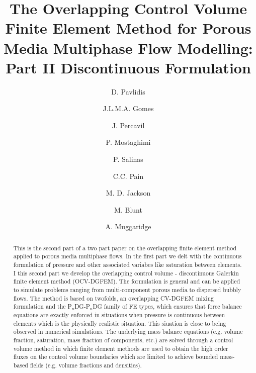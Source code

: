 \documentclass[preprint,authoryear,12pt]{elsarticle}
\begin{document}
\begin{frontmatter}



\title{The Overlapping Control Volume Finite Element Method for Porous Media Multiphase Flow Modelling: Part II 
Discontinuous Formulation}

\author{D. Pavlidis} 
\author{J.L.M.A. Gomes}
\author{J. Percavil} 
\author{P. Mostaghimi} 
\author{P. Salinas} \author{C.C. Pain} \author{M. D. Jackson} 
\author{M. Blunt} \author{A. Muggaridge} 

\address{Applied Modelling and Computation Group, Department of Earth Science and Engineering, Imperial College London}

\begin{abstract} 
This is the second part of a two part paper on the overlapping finite 
element method applied to porous media multiphase flows. 
In the first part we delt with the continuous formulation of 
pressure and other associated variabes like saturation between elements. 
I this second part we develop the  overlapping control volume - discontinuous 
Galerkin finite element method (OCV-DGFEM). The formulation is general
and can be applied to simulate problems ranging from multi-component
porous media to dispersed bubbly flows. The method is based on
twofolds, an overlapping CV-DGFEM mixing formulation and the 
P$_{n}$DG-P$_{n}$DG family of FE types, which ensures that
force balance equations are exactly enforced in situations when 
pressure is continuous between elements which is the physically realistic situation. 
This siuation is close to being observed in numerical simulations. 
The underlying mass
balance equations (e.g. volume fraction, saturation, mass fraction of
components, etc.) are solved through a control volume method in which
finite element methods are used to obtain the high order fluxes on the
control volume boundaries which are limited to achieve bounded
mass-based fields (e.g. volume fractions and densities).
\end{abstract}


\end{frontmatter}
\end{document}
